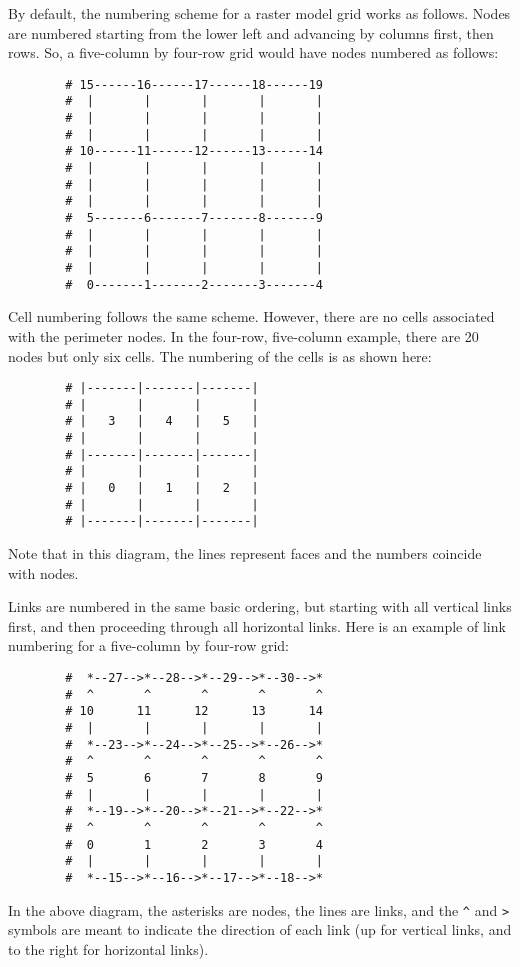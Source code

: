 \documentclass[12pt]{amsart}
\begin{document}
By default, the numbering scheme for a raster model grid works as follows. Nodes are numbered starting from the lower left and advancing by columns first, then rows. So, a five-column by four-row grid would have nodes numbered as follows:
\newpage
\begin{verbatim}
        # 15------16------17------18------19
        #  |       |       |       |       |
        #  |       |       |       |       |
        #  |       |       |       |       |
        # 10------11------12------13------14
        #  |       |       |       |       |
        #  |       |       |       |       |   
        #  |       |       |       |       |
        #  5-------6-------7-------8-------9
        #  |       |       |       |       |
        #  |       |       |       |       |
        #  |       |       |       |       |
        #  0-------1-------2-------3-------4
\end{verbatim}

Cell numbering follows the same scheme. However, there are no cells associated with the perimeter nodes. In the four-row, five-column example, there are 20 nodes but only six cells. The numbering of the cells is as shown here:
\begin{verbatim}
        # |-------|-------|-------|
        # |       |       |       |
        # |   3   |   4   |   5   |
        # |       |       |       |
        # |-------|-------|-------|
        # |       |       |       |
        # |   0   |   1   |   2   |
        # |       |       |       |
        # |-------|-------|-------|
\end{verbatim}
Note that in this diagram, the lines represent faces and the numbers coincide with nodes.

Links are numbered in the same basic ordering, but starting with all vertical links first, and then proceeding through all horizontal links. Here is an example of link numbering for a five-column by four-row grid:
\newpage
\begin{verbatim}
        #  *--27-->*--28-->*--29-->*--30-->*
        #  ^       ^       ^       ^       ^
        # 10      11      12      13      14
        #  |       |       |       |       |
        #  *--23-->*--24-->*--25-->*--26-->*
        #  ^       ^       ^       ^       ^
        #  5       6       7       8       9   
        #  |       |       |       |       |
        #  *--19-->*--20-->*--21-->*--22-->*
        #  ^       ^       ^       ^       ^
        #  0       1       2       3       4
        #  |       |       |       |       |
        #  *--15-->*--16-->*--17-->*--18-->*
\end{verbatim}
In the above diagram, the asterisks are nodes, the lines are links, and the \verb!^! and \verb!>! symbols are meant to indicate the direction of each link (up for vertical links, and to the right for horizontal links).
\end{document}

